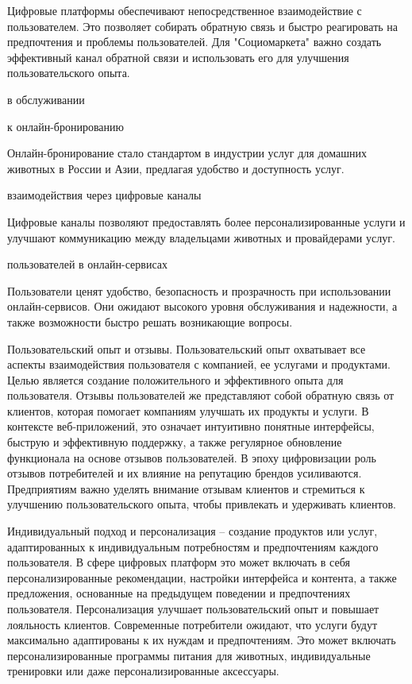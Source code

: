 Цифровые платформы обеспечивают непосредственное взаимодействие с пользователем. Это позволяет собирать обратную связь и быстро реагировать на предпочтения и проблемы пользователей. Для "Социомаркета" важно создать эффективный канал обратной связи и использовать его для улучшения пользовательского опыта.

 в обслуживании

 к онлайн-бронированию

Онлайн-бронирование стало стандартом в индустрии услуг для домашних животных в России и Азии, предлагая удобство и доступность услуг.

 взаимодействия через цифровые каналы

Цифровые каналы позволяют предоставлять более персонализированные услуги и улучшают коммуникацию между владельцами животных и провайдерами услуг.

 пользователей в онлайн-сервисах

Пользователи ценят удобство, безопасность и прозрачность при использовании онлайн-сервисов. Они ожидают высокого уровня обслуживания и надежности, а также возможности быстро решать возникающие вопросы.

Пользовательский опыт и отзывы. Пользовательский опыт охватывает все аспекты взаимодействия пользователя с компанией, ее услугами и продуктами. Целью является создание положительного и эффективного опыта для пользователя. Отзывы пользователей же представляют собой обратную связь от клиентов, которая помогает компаниям улучшать их продукты и услуги. В контексте веб-приложений, это означает интуитивно понятные интерфейсы, быструю и эффективную поддержку, а также регулярное обновление функционала на основе отзывов пользователей. В эпоху цифровизации роль отзывов потребителей и их влияние на репутацию брендов усиливаются. Предприятиям важно уделять внимание отзывам клиентов и стремиться к улучшению пользовательского опыта, чтобы привлекать и удерживать клиентов.

Индивидуальный подход и персонализация – создание продуктов или услуг, адаптированных к индивидуальным потребностям и предпочтениям каждого пользователя. В сфере цифровых платформ это может включать в себя персонализированные рекомендации, настройки интерфейса и контента, а также предложения, основанные на предыдущем поведении и предпочтениях пользователя. Персонализация улучшает пользовательский опыт и повышает лояльность клиентов. Современные потребители ожидают, что услуги будут максимально адаптированы к их нуждам и предпочтениям. Это может включать персонализированные программы питания для животных, индивидуальные тренировки или даже персонализированные аксессуары.

